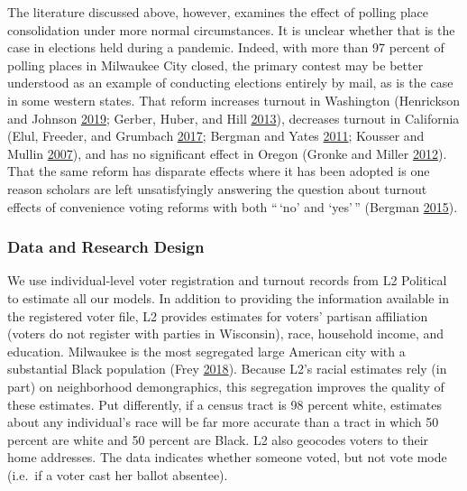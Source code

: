 \documentclass[
  12pt,
]{article}
\begin{document}
The literature discussed above, however, examines the effect of polling place consolidation under more normal circumstances. It is unclear whether that is the case in elections held during a pandemic. Indeed, with more than 97 percent of polling places in Milwaukee City closed, the primary contest may be better understood as an example of conducting elections entirely by mail, as is the case in some western states. That reform increases turnout in Washington (Henrickson and Johnson \protect\hyperlink{ref-Henrickson2019}{2019}; Gerber, Huber, and Hill \protect\hyperlink{ref-Gerber2013}{2013}), decreases turnout in California (Elul, Freeder, and Grumbach \protect\hyperlink{ref-Elul2017}{2017}; Bergman and Yates \protect\hyperlink{ref-Bergman2011}{2011}; Kousser and Mullin \protect\hyperlink{ref-Kousser2007}{2007}), and has no significant effect in Oregon (Gronke and Miller \protect\hyperlink{ref-Gronke2012}{2012}). That the same reform has disparate effects where it has been adopted is one reason scholars are left unsatisfyingly answering the question about turnout effects of convenience voting reforms with both ``\,`no' and `yes'\,'' (Bergman \protect\hyperlink{ref-Bergman2015}{2015}).

\hypertarget{data-and-research-design}{%
\subsubsection*{Data and Research Design}\label{data-and-research-design}}

We use individual-level voter registration and turnout records from L2 Political to estimate all our models. In addition to providing the information available in the registered voter file, L2 provides estimates for voters' partisan affiliation (voters do not register with parties in Wisconsin), race, household income, and education. Milwaukee is the most segregated large American city with a substantial Black population (Frey \protect\hyperlink{ref-Frey2018}{2018}). Because L2's racial estimates rely (in part) on neighborhood demongraphics, this segregation improves the quality of these estimates. Put differently, if a census tract is 98 percent white, estimates about any individual's race will be far more accurate than a tract in which 50 percent are white and 50 percent are Black. L2 also geocodes voters to their home addresses. The data indicates whether someone voted, but not vote mode (i.e.~if a voter cast her ballot absentee).
\end{document}
